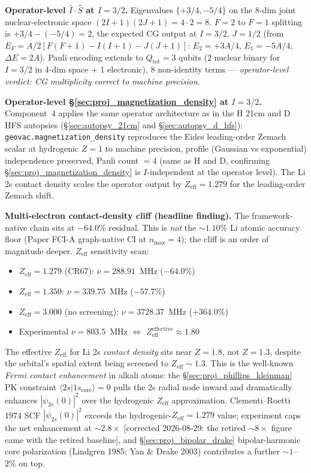 \documentclass[11pt]{article}
\begin{document}
\textbf{Operator-level $\hat{I}\cdot\hat{S}$ at $I=3/2$.}  Eigenvalues
$\{+3/4, -5/4\}$ on the 8-dim joint nuclear-electronic space
$(2I+1)(2J+1) = 4 \cdot 2 = 8$.  $F=2$ to $F=1$ splitting is
$+3/4 - (-5/4) = 2$, the expected CG output at $I=3/2$, $J=1/2$
(from $E_F = A/2[F(F+1) - I(I+1) - J(J+1)]$: $E_2 = +3A/4$,
$E_1 = -5A/4$, $\Delta E = 2A$).  Pauli encoding extends to
$Q_\text{tot} = 3$ qubits (2 nuclear binary for $I=3/2$ in 4-dim
space $+$ 1 electronic), 8 non-identity terms ---
\emph{operator-level verdict: CG multiplicity correct to machine precision}.

\textbf{Operator-level \S\ref{sec:proj_magnetization_density} at $I=3/2$.}
Component~4 applies the same operator architecture as in the H 21cm
and D HFS autopsies (\S\ref{sec:autopsy_21cm} and \S\ref{sec:autopsy_d_hfs}):
\texttt{geovac.magnetization\_density} reproduces the Eides leading-order
Zemach scalar at hydrogenic $Z=1$ to machine precision, profile (Gaussian
vs exponential) independence preserved, Pauli count $= 4$ (same as H and D,
confirming \S\ref{sec:proj_magnetization_density} is $I$-independent at the
operator level).  The Li 2s contact density scales the operator output by
$Z_\text{eff} = 1.279$ for the leading-order Zemach shift.

\textbf{Multi-electron contact-density cliff (headline finding).}
The framework-native chain sits at $-64.0\%$ residual.  This is
\emph{not} the $\sim 1.10\%$ Li atomic accuracy floor (Paper FCI-A
graph-native CI at $n_\text{max}=4$); the cliff is an order of magnitude
deeper.  $Z_\text{eff}$ sensitivity scan:

\begin{itemize}\setlength\itemsep{0pt}
\item $Z_\text{eff} = 1.279$ (CR67): $\nu = 288.91$~MHz ($-64.0\%$)
\item $Z_\text{eff} = 1.350$: $\nu = 339.75$~MHz ($-57.7\%$)
\item $Z_\text{eff} = 3.000$ (no screening): $\nu = 3728.37$~MHz ($+364.0\%$)
\item Experimental $\nu = 803.5$~MHz $\Leftrightarrow$
$Z_\text{eff}^\text{effective} \approx 1.80$
\end{itemize}

The effective $Z_\text{eff}$ for Li 2s \emph{contact density} sits
near $Z=1.8$, not $Z=1.3$, despite the orbital's spatial extent being
screened to $Z_\text{eff} \sim 1.3$.  This is the well-known
\emph{Fermi contact enhancement} in alkali atoms: the
\S\ref{sec:proj_phillips_kleinman} PK constraint
$\langle 2s | 1s_\text{core}\rangle = 0$ pulls the 2s radial node
inward and dramatically enhances $|\psi_{2s}(0)|^2$ over the hydrogenic
$Z_\text{eff}$ approximation.  Clementi--Roetti 1974 SCF
$|\psi_{2s}(0)|^2$ exceeds the hydrogenic-$Z_\text{eff}=1.279$ value;
experiment caps the net enhancement at $\sim 2.8\times$ [corrected
2026-08-29: the retired $\sim 8\times$ figure came with the retired
baseline], and \S\ref{sec:proj_bipolar_drake} bipolar-harmonic core
polarization (Lindgren 1985; Yan \& Drake 2003) contributes a further
$\sim 1$--$2\%$ on top.
\end{document}
